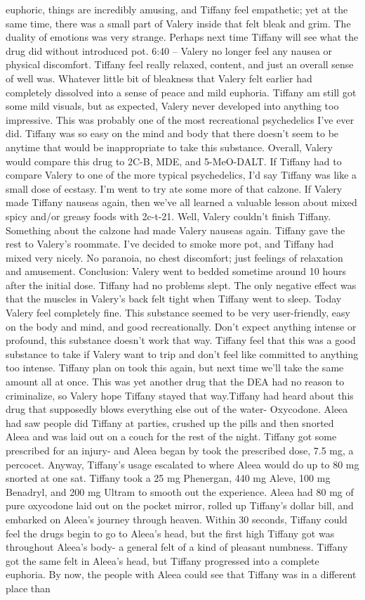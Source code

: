 \documentclass[12pt]{book}
\begin{document}
euphoric, things are incredibly amusing, and Tiffany feel empathetic; yet at the same time, there was a small part of Valery inside that felt bleak and grim. The duality of emotions was very strange. Perhaps next time Tiffany will see what the drug did without introduced pot. 6:40 -- Valery no longer feel any nausea or physical discomfort. Tiffany feel really relaxed, content, and just an overall sense of well was. Whatever little bit of bleakness that Valery felt earlier had completely dissolved into a sense of peace and mild euphoria. Tiffany am still got some mild visuals, but as expected, Valery never developed into anything too impressive. This was probably one of the most recreational psychedelics I've ever did. Tiffany was so easy on the mind and body that there doesn't seem to be anytime that would be inappropriate to take this substance. Overall, Valery would compare this drug to 2C-B, MDE, and 5-MeO-DALT. If Tiffany had to compare Valery to one of the more typical psychedelics, I'd say Tiffany was like a small dose of ecstasy. I'm went to try ate some more of that calzone. If Valery made Tiffany nauseas again, then we've all learned a valuable lesson about mixed spicy and/or greasy foods with 2c-t-21. Well, Valery couldn't finish Tiffany. Something about the calzone had made Valery nauseas again. Tiffany gave the rest to Valery's roommate. I've decided to smoke more pot, and Tiffany had mixed very nicely. No paranoia, no chest discomfort; just feelings of relaxation and amusement. Conclusion: Valery went to bedded sometime around 10 hours after the initial dose. Tiffany had no problems slept. The only negative effect was that the muscles in Valery's back felt tight when Tiffany went to sleep. Today Valery feel completely fine. This substance seemed to be very user-friendly, easy on the body and mind, and good recreationally. Don't expect anything intense or profound, this substance doesn't work that way. Tiffany feel that this was a good substance to take if Valery want to trip and don't feel like committed to anything too intense. Tiffany plan on took this again, but next time we'll take the same amount all at once. This was yet another drug that the DEA had no reason to criminalize, so Valery hope Tiffany stayed that way.Tiffany had heard about this drug that supposedly blows everything else out of the water- Oxycodone. Aleea had saw people did Tiffany at parties, crushed up the pills and then snorted Aleea and was laid out on a couch for the rest of the night. Tiffany got some prescribed for an injury- and Aleea began by took the prescribed dose, 7.5 mg, a percocet. Anyway, Tiffany's usage escalated to where Aleea would do up to 80 mg snorted at one sat. Tiffany took a 25 mg Phenergan, 440 mg Aleve, 100 mg Benadryl, and 200 mg Ultram to smooth out the experience. Aleea had 80 mg of pure oxycodone laid out on the pocket mirror, rolled up Tiffany's dollar bill, and embarked on Aleea's journey through heaven. Within 30 seconds, Tiffany could feel the drugs begin to go to Aleea's head, but the first high Tiffany got was throughout Aleea's body- a general felt of a kind of pleasant numbness. Tiffany got the same felt in Aleea's head, but Tiffany progressed into a complete euphoria. By now, the people with Aleea could see that Tiffany was in a different place than 
\end{document}
